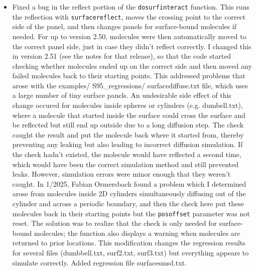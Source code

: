 \documentclass {scrbook}
\newcommand {\ttt} {\texttt}
\begin{document}
\begin{itemize}
\item Fixed a bug in the reflect portion of the \ttt{dosurfinteract} function. This runs the reflection with \ttt{surfacereflect}, moves the crossing point to the correct side of the panel, and then changes panels for surface-bound molecules if needed. For up to version 2.50, molecules were then automatically moved to the correct panel side, just in case they didn't reflect correctly. I changed this in version 2.51 (see the notes for that release), so that the code started checking whether molecules ended up on the correct side and then moved any failed molecules back to their starting points. This addressed problems that arose with the examples/ S95\_regressions/ surfacediffuse.txt file, which uses a large number of tiny surface panels. An undesirable side effect of this change occured for molecules inside spheres or cylinders (e.g. dumbell.txt), where a molecule that started inside the surface could cross the surface and be reflected but still end up outside due to a long diffusion step. The check caught the result and put the molecule back where it started from, thereby preventing any leaking but also leading to incorrect diffusion simulation. If the check hadn't existed, the molecule would have reflected a second time, which would have been the correct simulation method and still prevented leaks. However, simulation errors were minor enough that they weren't caught. In 1/2025, Fabian Ormersbach found a problem which I determined arose from molecules inside 2D cylinders simultaneously diffusing out of the cylinder and across a periodic boundary, and then the check here put these molecules back in their starting points but the \ttt{posoffset} parameter was not reset. The solution was to realize that the check is only needed for surface-bound molecules; the function also displays a warning when molecules are returned to prior locations. This modification changes the regression results for several files (dumbbell.txt, surf2.txt, surf3.txt) but everything appears to simulate correctly. Added regression file surfacesmsd.txt.


\end{itemize}
\end{document}
